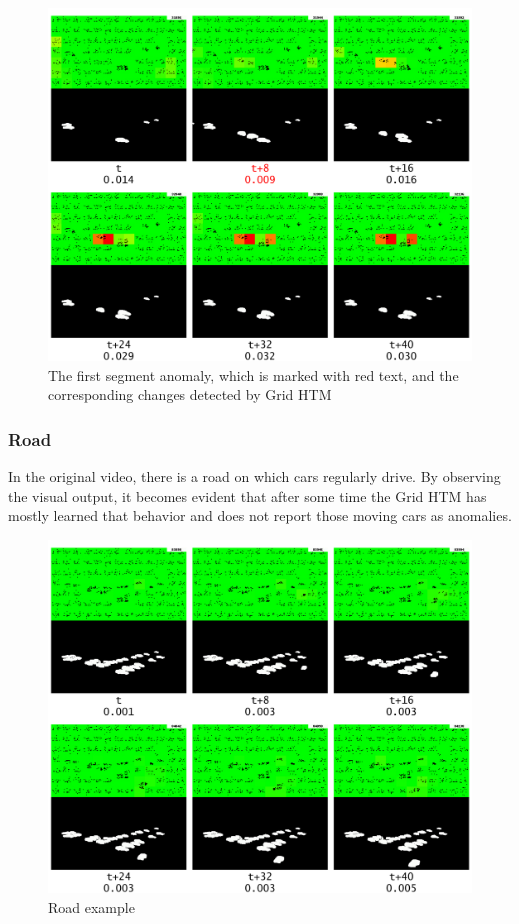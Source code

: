 \begin{figure}[H]
    \centering
    \includegraphics[width=\textwidth]{resources/experiments/surveillance/surveillance_anomaly_1.png}
    \caption{The first segment anomaly, which is marked with red text,  and the corresponding changes detected by Grid HTM}
    \label{fig:surveillance_segment}
\end{figure}
\subsubsection{Road}
In the original video, there is a road on which cars regularly drive. By observing the visual output, it becomes evident that after some time the Grid HTM has mostly learned that behavior and does not report those moving cars as anomalies.
\begin{figure}[H]
    \centering
    \includegraphics[width=\textwidth]{resources/experiments/surveillance/surveillance_road_1.png}
    \caption{Road example}
\end{figure}
